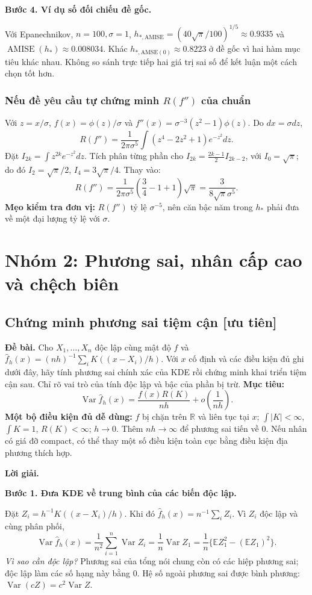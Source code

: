\documentclass[11pt,a4paper]{article}
\DeclareMathOperator{\AMISE}{AMISE}
\newcommand{\E}{\mathbb E}
\newcommand{\R}{\mathbb R}
\newcommand{\fh}{\widehat f_h}
\DeclareMathOperator{\Var}{Var}
\newcommand{\buoc}[1]{\par\medskip\textbf{#1}\par}
\begin{document}
\buoc{Bước 4. Ví dụ số đối chiếu đề gốc.}
Với Epanechnikov, $n=100,\sigma=1$, $h_{*,\mathrm{AMISE}}=(40\sqrt\pi/100)^{1/5}\approx0.9335$ và $\AMISE(h_*)\approx0.008034$. Khác $h_{*,\mathrm{AMSE}(0)}\approx0.8223$ ở đề gốc vì hai hàm mục tiêu khác nhau. Không so sánh trực tiếp hai giá trị sai số để kết luận một cách chọn tốt hơn.

\subsubsection*{Nếu đề yêu cầu tự chứng minh $R(f'')$ của chuẩn}
Với $z=x/\sigma$, $f(x)=\phi(z)/\sigma$ và $f''(x)=\sigma^{-3}(z^2-1)\phi(z)$. Do $dx=\sigma dz$,
\[
R(f'')=\frac{1}{2\pi\sigma^5}\int(z^4-2z^2+1)e^{-z^2}dz.
\]
Đặt $I_{2k}=\int z^{2k}e^{-z^2}dz$. Tích phân từng phần cho
$I_{2k}=\frac{2k-1}{2}I_{2k-2}$, với $I_0=\sqrt\pi$; do đó $I_2=\sqrt\pi/2$, $I_4=3\sqrt\pi/4$. Thay vào:
\[
R(f'')=\frac{1}{2\pi\sigma^5}\left(\frac34-1+1\right)\sqrt\pi
=\boxed{\frac3{8\sqrt\pi\sigma^5}}.
\]
\textbf{Mẹo kiểm tra đơn vị:} $R(f'')$ tỷ lệ $\sigma^{-5}$, nên căn bậc năm trong $h_*$ phải đưa về một đại lượng tỷ lệ với $\sigma$.

\section{Nhóm 2: Phương sai, nhân cấp cao và chệch biên}
\subsection{Chứng minh phương sai tiệm cận [ưu tiên]}\label{sec:variance}
\textbf{Đề bài.} Cho $X_1,\ldots,X_n$ độc lập cùng mật độ $f$ và
$\widehat f_h(x)=(nh)^{-1}\sum_iK((x-X_i)/h)$.
Với $x$ cố định và các điều kiện đủ ghi dưới đây, hãy tính phương sai chính xác
của KDE rồi chứng minh khai triển tiệm cận sau. Chỉ rõ vai trò của tính độc lập và bậc của phần bị trừ.
\textbf{Mục tiêu:}
\[
\Var\fh(x)=\frac{f(x)R(K)}{nh}+o\!\left(\frac1{nh}\right).
\]
\textbf{Một bộ điều kiện đủ dễ dùng:} $f$ bị chặn trên $\R$ và liên tục tại $x$; $\int|K|<\infty$, $\int K=1$, $R(K)<\infty$; $h\to0$. Thêm $nh\to\infty$ để phương sai tiến về 0. Nếu nhân có giá đỡ compact, có thể thay một số điều kiện toàn cục bằng điều kiện địa phương thích hợp.

\textbf{Lời giải.}
\buoc{Bước 1. Đưa KDE về trung bình của các biến độc lập.}
Đặt $Z_i=h^{-1}K((x-X_i)/h)$. Khi đó $\fh(x)=n^{-1}\sum_iZ_i$. Vì $Z_i$ độc lập và cùng phân phối,
\[
\Var\fh(x)=\frac1{n^2}\sum_{i=1}^n\Var Z_i
=\frac1n\Var Z_1
=\frac1n\{\E Z_1^2-(\E Z_1)^2\}.
\]
\textit{Vì sao cần độc lập?} Phương sai của tổng nói chung còn có các hiệp phương sai; độc lập làm các số hạng này bằng 0. Hệ số ngoài phương sai được bình phương: $\Var(cZ)=c^2\Var Z$.
\end{document}
